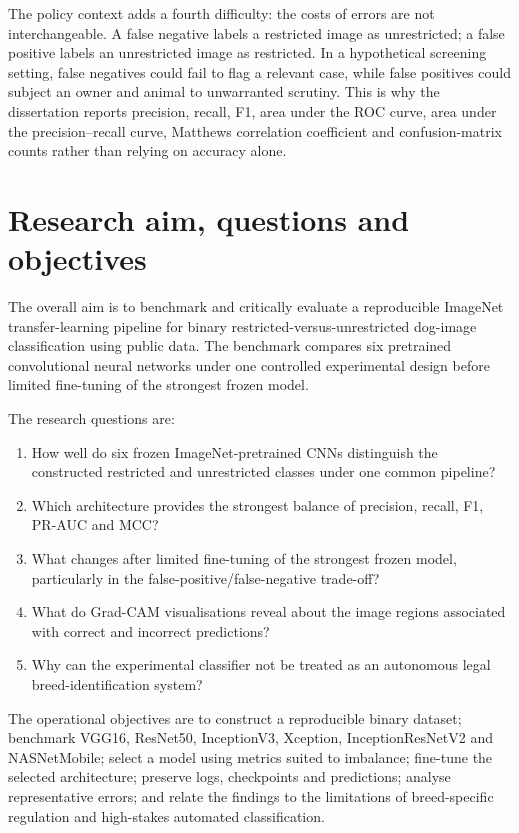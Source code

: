 The policy context adds a fourth difficulty: the costs of errors are not interchangeable. A false negative labels a restricted image as unrestricted; a false positive labels an unrestricted image as restricted. In a hypothetical screening setting, false negatives could fail to flag a relevant case, while false positives could subject an owner and animal to unwarranted scrutiny. This is why the dissertation reports precision, recall, F1, area under the ROC curve, area under the precision--recall curve, Matthews correlation coefficient and confusion-matrix counts rather than relying on accuracy alone.

\section{Research aim, questions and objectives}
The overall aim is to benchmark and critically evaluate a reproducible ImageNet transfer-learning pipeline for binary restricted-versus-unrestricted dog-image classification using public data. The benchmark compares six pretrained convolutional neural networks under one controlled experimental design before limited fine-tuning of the strongest frozen model.

The research questions are:
\begin{enumerate}
    \item How well do six frozen ImageNet-pretrained CNNs distinguish the constructed restricted and unrestricted classes under one common pipeline?
    \item Which architecture provides the strongest balance of precision, recall, F1, PR-AUC and MCC?
    \item What changes after limited fine-tuning of the strongest frozen model, particularly in the false-positive/false-negative trade-off?
    \item What do Grad-CAM visualisations reveal about the image regions associated with correct and incorrect predictions?
    \item Why can the experimental classifier not be treated as an autonomous legal breed-identification system?
\end{enumerate}

The operational objectives are to construct a reproducible binary dataset; benchmark VGG16, ResNet50, InceptionV3, Xception, InceptionResNetV2 and NASNetMobile; select a model using metrics suited to imbalance; fine-tune the selected architecture; preserve logs, checkpoints and predictions; analyse representative errors; and relate the findings to the limitations of breed-specific regulation and high-stakes automated classification.

